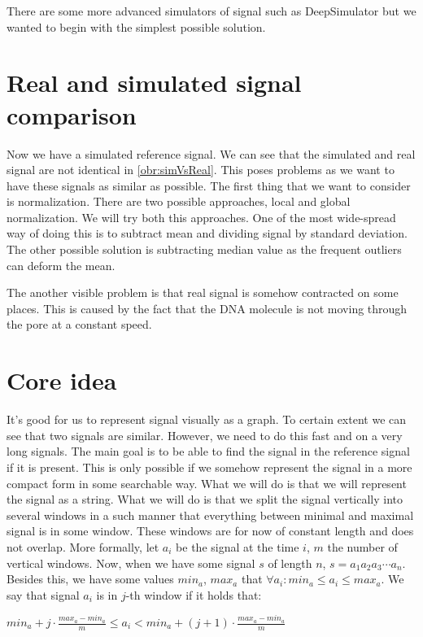 There are some more advanced simulators of signal such as DeepSimulator but we
wanted to begin with the simplest possible solution.

\section{Real and simulated signal comparison}

Now we have a simulated reference signal. We can see that the simulated and real
signal are not identical in \ref{obr:simVsReal}. This poses problems as we want to have these signals as
similar as possible. The first thing that we want to consider is normalization. There
are two possible approaches, local and global normalization. We will try both this
approaches. One of the most wide-spread way of doing this is to subtract mean and dividing
signal by standard deviation. The other possible solution is subtracting median value
as the frequent outliers can deform the mean. 

The another visible problem is that real signal is somehow contracted
on some places. This is caused by the fact that the DNA molecule is not moving
through the pore at a constant speed. 

\section{Core idea}

It's good for us to represent signal visually as a graph. To certain extent we
can see that two signals are similar. However, we need to do this fast and on a very
long signals. The main goal is to be able to find the signal in the reference
signal if it is present. This is only possible if we somehow represent the signal
in a more compact form in some searchable way. What we will do is that we will
represent the signal as a string. What we will do is that we split the signal vertically
into several windows in a such manner that everything between minimal and maximal
signal is in some window. These windows are for now of constant length and does not
overlap. More formally, let $a_i$ be the signal at the time $i$, $m$ the number of
vertical windows. Now, when we have some signal $s$ of length $n$, $s=a_1a_2a_3\cdots a_n$.
Besides this, we have some values $min_a$, $max_a$ that $\forall a_i: min_a \leq a_i \leq max_a$. We say that signal $a_i$ is in $j$-th
window if it holds that:

\begin{center}
$min_a + j\cdot \frac{max_a-min_a}{m} \leq a_i < min_a + (j+1)\cdot \frac{max_a-min_a}{m}$
\end{center}

